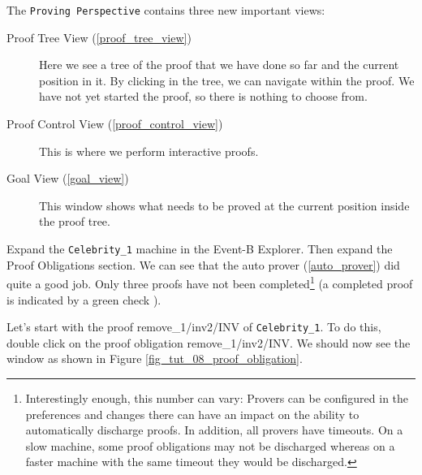 The \texttt{Proving Perspective} contains three new important views:

\begin{description}
	\item[Proof Tree View (\ref{proof_tree_view})] Here we see a tree of the proof that we have done so far and the current position in it. By clicking in the tree, we can navigate within the proof. We have not yet started the proof, so there is nothing to choose from.
	\item[Proof Control View (\ref{proof_control_view})] This is where we perform interactive proofs.
	\item[Goal View (\ref{goal_view})] This window shows what needs to be proved at the current position inside the proof tree.
\end{description}

Expand the \texttt{Celebrity\_1} machine in the \textsf{Event-B Explorer}. Then expand the \textsf{Proof Obligations} section. We can see that the auto prover (\ref{auto_prover}) did quite a good job. Only three proofs have not been completed\footnote{Interestingly enough, this number can vary: Provers can be configured in the preferences and changes there can have an impact on the ability to automatically discharge proofs.  In addition, all provers have timeouts.  On a slow machine, some proof obligations may not be discharged whereas on a faster machine with the same timeout they would be discharged.}  (a completed proof is indicated by a green check ). 


Let's start with the proof \textsf{remove\_1/inv2/INV} of \texttt{Celebrity\_1}.
To do this, double click on the proof obligation \textsf{remove\_1/inv2/INV}.
We should now see the window as shown in Figure \ref{fig_tut_08_proof_obligation}.


